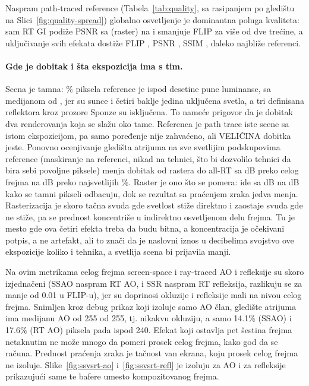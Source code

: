 Naspram path-traced reference (Tabela~\ref{tab:quality}, sa rasipanjem po gledi\v{s}tu na
Slici~\ref{fig:quality-spread}) globalno osvetljenje je dominantna
poluga kvaliteta: sam RT GI podi\v{z}e
PSNR sa \qRasterPsnr{} (raster) na \qRtGiPsnr{} i smanjuje FLIP za vi\v{s}e od dve tre\'cine, a uklju\v{c}ivanje
svih efekata dosti\v{z}e FLIP \qAllRtFlip{}, PSNR \qAllRtPsnr{}, SSIM \qAllRtSsim{}, daleko najbli\v{z}e
referenci.

\paragraph{Gde je dobitak i \v{s}ta ekspozicija ima s tim.} Scena je tamna:
\exDarkShare\% piksela reference je ispod desetine pune luminanse, sa medijanom od
\exMedianLuma{}, jer su sunce i \v{c}etiri baklje jedina uklju\v{c}ena svetla, a tri
definisana reflektora kroz prozore Sponze su isklju\v{c}ena. To name\'ce prigovor da je dobitak dva renderovanja
koja se sla\v{z}u oko tame. Referenca je path trace iste scene sa istom ekspozicijom, pa
samo poređenje nije zahva\'ceno, ali VELI\v{C}INA dobitka jeste. Ponovno ocenjivanje gledi\v{s}ta atrijuma
na sve svetlijim podskupovima reference (maskiranje na referenci, nikad na tehnici,
\v{s}to bi dozvolilo tehnici da bira sebi povoljne piksele) menja dobitak od rastera do all-RT
sa \exLiftAll{} dB preko celog frejma na \exLiftLit{} dB preko najsvetlijih \exLitShare\%. Raster je
ono \v{s}to se pomera: ide sa \exRasterAll{} dB na \exRasterLit{} dB kako se tamni pikseli odbacuju, dok
se rezultat sa pra\'cenjem zraka jedva menja. Rasterizacija je skoro ta\v{c}na svuda gde svetlost stiže
direktno i zaostaje svuda gde ne stiže, pa se prednost koncentri\v{s}e u indirektno osvetljenom
delu frejma. Tu je mesto gde ova \v{c}etiri efekta treba da budu bitna, a koncentracija je
o\v{c}ekivani potpis, a ne artefakt, ali to zna\v{c}i da je naslovni iznos u decibelima
svojstvo ove ekspozicije koliko i tehnika, a svetlija scena bi prijavila manji.

Na ovim
metrikama celog frejma screen-space i ray-traced AO i refleksije su skoro izjedna\v{c}eni (SSAO naspram RT AO,
i SSR naspram RT refleksija, razlikuju se za manje od 0.01 u FLIP-u), jer su doprinosi okluzije i refleksije
mali na nivou celog frejma. Snimljen kroz debug prikaz koji izoluje samo
AO \v{c}lan, gledi\v{s}te atrijuma ima medijanu AO
od 255 od 255, tj. nikakvu okluziju, a samo 14.1\% (SSAO) i 17.6\% (RT AO) piksela pada
ispod 240. Efekat koji ostavlja pet \v{s}estina frejma netaknutim ne mo\v{z}e mnogo da pomeri prosek celog frejma,
kako god da se ra\v{c}una. Prednost pra\'cenja zraka je ta\v{c}nost van ekrana, koju prosek celog frejma
ne izoluje. Slike~\ref{fig:ssvsrt-ao} i~\ref{fig:ssvsrt-refl} je izoluju
za AO i za refleksije prikazuju\'ci same te bafere umesto kompozitovanog frejma.

